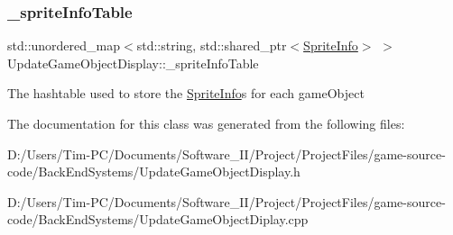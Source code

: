 \subsubsection{\texorpdfstring{\+\_\+sprite\+Info\+Table}{\_spriteInfoTable}}
{\footnotesize\ttfamily std\+::unordered\+\_\+map$<$std\+::string, std\+::shared\+\_\+ptr$<$\hyperlink{struct_sprite_info}{Sprite\+Info}$>$ $>$ Update\+Game\+Object\+Display\+::\+\_\+sprite\+Info\+Table\hspace{0.3cm}{\ttfamily [private]}}

The hashtable used to store the \hyperlink{struct_sprite_info}{Sprite\+Info}\textquotesingle{}s for each game\+Object 

The documentation for this class was generated from the following files\+:\begin{DoxyCompactItemize}
\item 
D\+:/\+Users/\+Tim-\/\+P\+C/\+Documents/\+Software\+\_\+\+I\+I/\+Project/\+Project\+Files/game-\/source-\/code/\+Back\+End\+Systems/Update\+Game\+Object\+Display.\+h\item 
D\+:/\+Users/\+Tim-\/\+P\+C/\+Documents/\+Software\+\_\+\+I\+I/\+Project/\+Project\+Files/game-\/source-\/code/\+Back\+End\+Systems/Update\+Game\+Object\+Diplay.\+cpp\end{DoxyCompactItemize}
